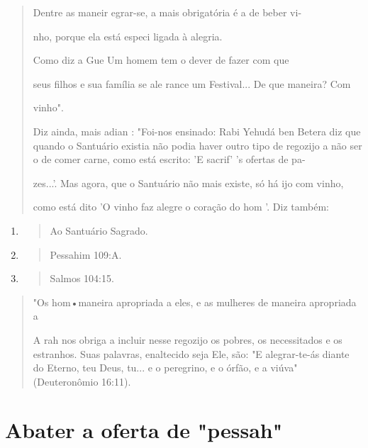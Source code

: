\begin{quote}
Dentre as maneir egrar-se, a mais obrigatória é a de beber vi-

nho, porque ela está especi ligada à alegria.

Como diz a Gue Um homem tem o dever de fazer com que

seus filhos e sua família se ale rance um Festival... De que maneira?
Com

vinho".

Diz ainda, mais adian : "Foi-nos ensinado: Rabi Yehudá ben Bete­ra diz
que quando o Santuário existia não podia haver outro tipo de regozijo a
não ser o de comer carne, como está escrito: 'E sacrif' 's ofertas de
pa-

zes...'. Mas agora, que o Santuário não mais existe, só há ijo com
vinho,

como está dito 'O vinho faz alegre o coração do hom '. Diz também:
\end{quote}

\begin{enumerate}
\def\labelenumi{\arabic{enumi}.}
\setcounter{enumi}{70}
\item
 \begin{quote}
 Ao Santuário Sagrado.
 \end{quote}
\item
 \begin{quote}
 Pessahim 109:A.
 \end{quote}
\item
 \begin{quote}
 Salmos 104:15.
 \end{quote}
\end{enumerate}

\begin{quote}

"Os hom•maneira apropriada a eles, e as mulheres de maneira apro­priada
a

A rah nos obriga a incluir nesse regozijo os pobres, os necessita­dos e
os estranhos. Suas palavras, enaltecido seja Ele, são: "E alegrar-te-ás
dian­te do Eterno, teu Deus, tu... e o peregrino, e o órfão, e a viúva"
(Deuteronômio 16:11).
\end{quote}

\section{Abater a oferta de "pessah"}

